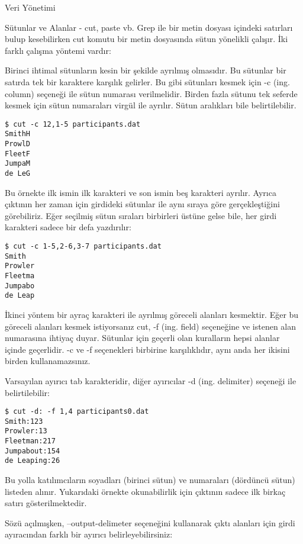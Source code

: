 \begin{section}{Veri Yönetimi}
\begin{subsection}{Sütunlar ve Alanlar - cut, paste vb.}
Grep ile bir metin dosyası içindeki satırları bulup kesebilirken cut komutu bir metin dosyasında sütun yönelikli çalışır. İki farklı çalışma yöntemi vardır:

Birinci ihtimal sütunların kesin bir şekilde ayrılmış olmasıdır. Bu sütunlar bir satırda tek bir karaktere karşılık gelirler. Bu gibi sütunları kesmek için -c (ing. column) seçeneği ile sütun numarası verilmelidir. Birden fazla sütunu tek seferde kesmek için sütun numaraları virgül ile ayrılır. Sütun aralıkları bile belirtilebilir.

\footnotesize
\begin{verbatim}
$ cut -c 12,1-5 participants.dat
SmithH 
ProwlD 
FleetF 
JumpaM 
de LeG 
\end{verbatim}
\normalsize

Bu örnekte ilk ismin ilk karakteri ve son ismin beş karakteri ayrılır. Ayrıca çıktının her zaman için girdideki sütunlar ile aynı sıraya göre gerçekleştiğini görebiliriz. Eğer seçilmiş sütun sıraları birbirleri üstüne gelse bile, her girdi karakteri sadece bir defa yazdırılır:

\footnotesize
\begin{verbatim}
$ cut -c 1-5,2-6,3-7 participants.dat
Smith 
Prowler 
Fleetma 
Jumpabo 
de Leap
\end{verbatim}
\normalsize

İkinci yöntem bir ayraç karakteri ile ayrılmış göreceli alanları kesmektir. Eğer bu göreceli alanları kesmek istiyorsanız cut, -f (ing. field) seçeneğine ve istenen alan numarasına ihtiyaç duyar. Sütunlar için geçerli olan kuralların hepsi alanlar içinde geçerlidir. -c ve -f seçenekleri birbirine karşılıklıdır, aynı anda her ikisini birden kullanamazsınız.

Varsayılan ayırıcı tab karakteridir, diğer ayırıcılar -d (ing. delimiter) seçeneği ile belirtilebilir:

\footnotesize
\begin{verbatim}
$ cut -d: -f 1,4 participants0.dat
Smith:123 
Prowler:13 
Fleetman:217 
Jumpabout:154 
de Leaping:26
\end{verbatim}
\normalsize

Bu yolla katılımcıların soyadları (birinci sütun) ve numaraları (dördüncü sütun) listeden alınır. Yukarıdaki örnekte okunabilirlik için çıktının sadece ilk birkaç satırı gösterilmektedir.

Sözü açılmışken, --output-delimeter seçeneğini kullanarak çıktı alanları için girdi ayıracından farklı bir ayırıcı belirleyebilirsiniz:


\end{subsection}
\end{section}
